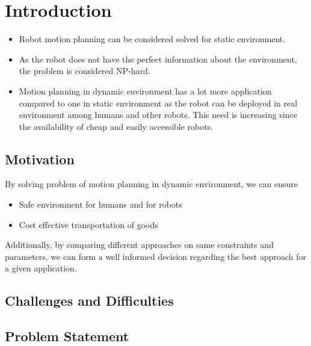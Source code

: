 
\chapter{Introduction}

\begin{itemize}
\item Robot motion planning can be considered solved for static environment\cite{large2005navigation}.  
\item As the robot does not have the perfect information about the environment, the problem is considered NP-hard\cite{keshmiri2009overview}.
\item Motion planning in dynamic environment has a lot more application compared to one in static environment as the robot can be deployed in real environment among humans and other robots. This need is increasing since the availability of cheap and easily accessible robots.
\end{itemize}


\section{Motivation}
By solving problem of motion planning in dynamic environment, we can ensure 
\begin{itemize}
    \item Safe environment for humans and for robots
    \item Cost effective transportation of goods
\end{itemize}
Additionally, by comparing different approaches on same constraints and parameters, we can form a well informed decision regarding the best approach for a given application.



\section{Challenges and Difficulties}



\section{Problem Statement}

